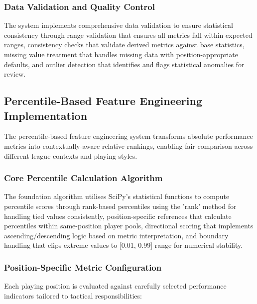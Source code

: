 \subsubsection{Data Validation and Quality Control}

The system implements comprehensive data validation to ensure statistical consistency through range validation that ensures all metrics fall within expected ranges, consistency checks that validate derived metrics against base statistics, missing value treatment that handles missing data with position-appropriate defaults, and outlier detection that identifies and flags statistical anomalies for review.

\subsection{Percentile-Based Feature Engineering Implementation}

The percentile-based feature engineering system transforms absolute performance metrics into contextually-aware relative rankings, enabling fair comparison across different league contexts and playing styles.

\subsubsection{Core Percentile Calculation Algorithm}

The foundation algorithm utilises SciPy's statistical functions to compute percentile scores through rank-based percentiles using the 'rank' method for handling tied values consistently, position-specific references that calculate percentiles within same-position player pools, directional scoring that implements ascending/descending logic based on metric interpretation, and boundary handling that clips extreme values to [0.01, 0.99] range for numerical stability.

\subsubsection{Position-Specific Metric Configuration}

Each playing position is evaluated against carefully selected performance indicators tailored to tactical responsibilities:

